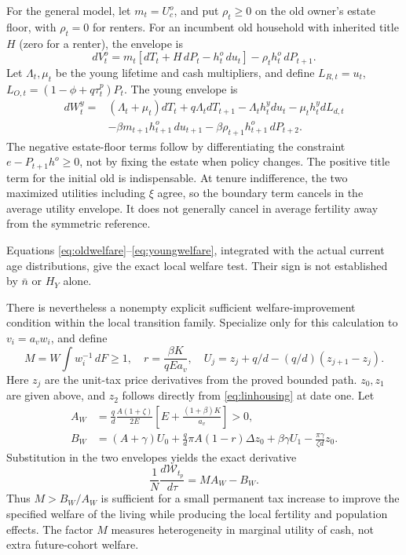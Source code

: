 \documentclass[11pt]{article}
\newcommand{\dd}{\,d}
\newcommand{\Welf}{\mathcal W}
\begin{document}
For the general model, let $m_t=U_c^o$, and put $\rho_t\ge0$ on the old owner's estate floor, with $\rho_t=0$ for renters. For an incumbent old household with inherited title $H$ (zero for a renter), the envelope is
\begin{equation}
 dV_t^o=m_t[dT_t+H\,dP_t-h_t^o\,du_t]-\rho_t h_t^o\,dP_{t+1}.\label{eq:oldwelfare}
\end{equation}
Let $\Lambda_t,\mu_t$ be the young lifetime and cash multipliers, and define
$L_{R,t}=u_t$, $L_{O,t}=(1-\phi+q\tau_t^p)P_t$. The young envelope is
\begin{equation}
\begin{split}
 dW_t^y={}&(\Lambda_t+\mu_t)dT_t+q\Lambda_t dT_{t+1}
 -\Lambda_t h_t^ydu_t-\mu_t h_t^y dL_{d,t}\\
 &-\beta m_{t+1}h_{t+1}^o\,du_{t+1}
 -\beta\rho_{t+1}h_{t+1}^o\,dP_{t+2}.\label{eq:youngwelfare}
\end{split}
\end{equation}
The negative estate-floor terms follow by differentiating the constraint $e-P_{t+1}h^o\ge0$, not by fixing the estate when policy changes. The positive title term for the initial old is indispensable. At tenure indifference, the two maximized utilities including $\xi$ agree, so the boundary term cancels in the average utility envelope. It does not generally cancel in average fertility away from the symmetric reference.

Equations \eqref{eq:oldwelfare}--\eqref{eq:youngwelfare}, integrated with the actual current age distributions, give the exact local welfare test. Their sign is not established by $\bar n$ or $H_Y$ alone.

There is nevertheless a nonempty explicit sufficient welfare-improvement condition within the local transition family. Specialize only for this calculation to $v_i=a_vw_i$, and define
\[
 M=W\int w_i^{-1}\dd F\ge1,\quad
 r=\frac{\beta K}{qEa_v},\quad
 U_j=z_j+q/d-(q/d)(z_{j+1}-z_j).
\]
Here $z_j$ are the unit-tax price derivatives from the proved bounded path. $z_0,z_1$ are given above, and $z_2$ follows directly from \eqref{eq:linhousing} at date one. Let
\begin{align}
 A_W&=\frac qd\frac{A(1+\zeta)}{2E}
           \left[E+\frac{(1+\beta)K}{a_v}\right]>0,\nonumber\\
 B_W&=(A+\gamma)U_0+\frac qd\pi A(1-r)\Delta z_0
              +\beta\gamma U_1-\frac{\pi\gamma}{\zeta d}z_0.\label{eq:welfarethreshold}
\end{align}
Substitution in the two envelopes yields the exact derivative
\begin{equation}
 \frac1N\frac{d\Welf_{t_p}}{d\tau}=M A_W-B_W.\label{eq:welfaresufficient}
\end{equation}
Thus $M>B_W/A_W$ is sufficient for a small permanent tax increase to improve the specified welfare of the living while producing the local fertility and population effects. The factor $M$ measures heterogeneity in marginal utility of cash, not extra future-cohort welfare.
\end{document}
